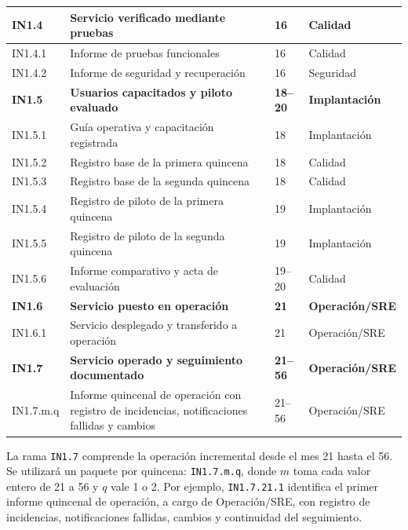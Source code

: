 \begin{longtable}{
  L{\tabcolsep\relax}
  L{\tabcolsep\relax}
  L{\tabcolsep\relax}
  L{\tabcolsep\relax}
}
  \textbf{IN1.4} & \textbf{Servicio verificado mediante pruebas} &
\textbf{16} & \textbf{Calidad} \\
  \hline
  IN1.4.1 & Informe de pruebas funcionales &
16 & Calidad \\
  \hline
  IN1.4.2 & Informe de seguridad y recuperación &
16 & Seguridad \\
  \hline

  \textbf{IN1.5} & \textbf{Usuarios capacitados y piloto evaluado} &
\textbf{18--20} & \textbf{Implantación} \\
  \hline
  IN1.5.1 & Guía operativa y capacitación registrada &
18 & Implantación \\
  \hline
  IN1.5.2 & Registro base de la primera quincena &
18 & Calidad \\
  \hline
  IN1.5.3 & Registro base de la segunda quincena &
18 & Calidad \\
  \hline
  IN1.5.4 & Registro de piloto de la primera quincena &
19 & Implantación \\
  \hline
  IN1.5.5 & Registro de piloto de la segunda quincena &
19 & Implantación \\
  \hline
  IN1.5.6 & Informe comparativo y acta de evaluación &
19--20 & Calidad \\
  \hline

  \textbf{IN1.6} & \textbf{Servicio puesto en operación} &
\textbf{21} & \textbf{Operación/SRE} \\
  \hline
  IN1.6.1 & Servicio desplegado y transferido a operación &
21 & Operación/SRE \\
  \hline

  \textbf{IN1.7} & \textbf{Servicio operado y seguimiento documentado} &
\textbf{21--56} & \textbf{Operación/SRE} \\
  \hline
  IN1.7.m.q & Informe quincenal de operación con registro de
  incidencias, notificaciones fallidas y cambios &
21--56 & Operación/SRE \\
  \hline
\end{longtable}

La rama \texttt{IN1.7} comprende la operación incremental desde el mes 21 hasta el 56. Se utilizará un paquete por quincena: \texttt{IN1.7.m.q}, donde $m$ toma cada valor entero de 21 a 56 y $q$ vale 1 o 2. Por ejemplo, \texttt{IN1.7.21.1} identifica el primer informe quincenal de operación, a cargo de Operación/SRE, con registro de incidencias, notificaciones fallidas, cambios y continuidad del seguimiento.

